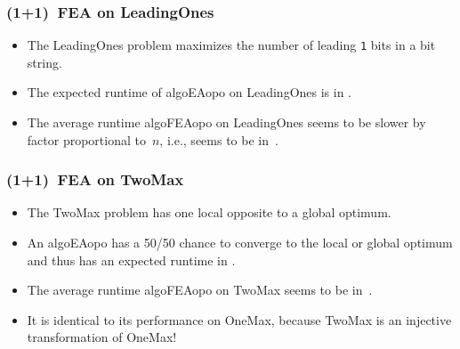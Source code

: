 \documentclass[aspectratio=169,mathserif,notheorems]{beamer}%
\begin{document}
%
\begin{frame}%
\frametitle{(1+1)~FEA on LeadingOnes}%
\parbox{0.37\paperwidth}{%
\begin{itemize}%
\item The LeadingOnes problem maximizes the number of leading \texttt{1} bits in a bit string\cite{W1989TGAASPWRBAORTIB,R1997CPOEA}.%
\item<2-> The expected runtime of \gls{algoEAopo} on LeadingOnes is in .\cite{DJW2002OTAOTOPOEA}%
\item<3-> The average runtime \gls{algoFEAopo} on LeadingOnes seems to be slower by factor proportional to~$n$, i.e., seems to be in~.%
\end{itemize}%
}%
%
%
%
\end{frame}%
%
\begin{frame}%
\frametitle{(1+1)~FEA on TwoMax}%
\parbox{0.37\paperwidth}{%
\begin{itemize}%
\item The TwoMax problem has one local opposite to a global optimum\cite{FQW2018ELDBOAWHTMO,VHGN2002FTTIMEAHSP}.%
\item<2-> An \gls{algoEAopo} has a 50/50 chance to converge to the local or global optimum and thus has an expected runtime in .\cite{FQW2018ELDBOAWHTMO,FOSW2009AODPMFGE}%
\item<3-> The average runtime \gls{algoFEAopo} on TwoMax seems to be in~.%
\item<4-> It is \alert{identical} to its performance on OneMax, because TwoMax is an injective transformation of OneMax!%
\end{itemize}%
}%
%
%
%
%
\end{frame}%
%
\end{document}
